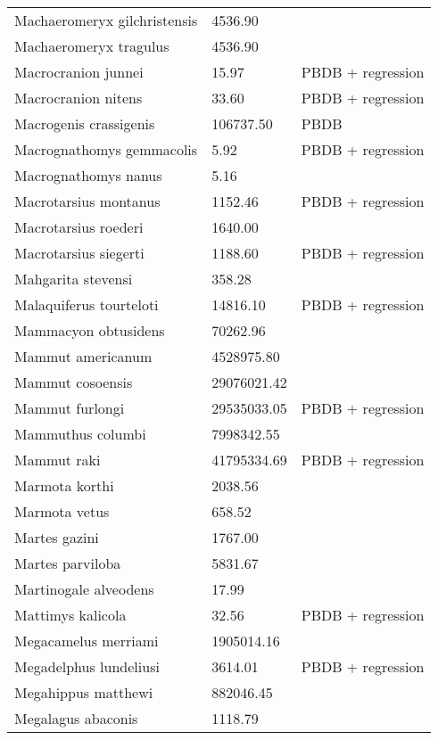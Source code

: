 \documentclass{article}
\begin{document}
\begin{center}
\begin{longtable}{p{} p{} p{} }
  Machaeromeryx gilchristensis & 4536.90 & \cite{Tomiya2013} \\ 
  Machaeromeryx tragulus & 4536.90 & \cite{Tomiya2013} \\ 
  Macrocranion junnei & 15.97 & PBDB + regression \\ 
  Macrocranion nitens & 33.60 & PBDB + regression \\ 
  Macrogenis crassigenis & 106737.50 & PBDB \\ 
  Macrognathomys gemmacolis & 5.92 & PBDB + regression \\ 
  Macrognathomys nanus & 5.16 & \cite{Tomiya2013} \\ 
  Macrotarsius montanus & 1152.46 & PBDB + regression \\ 
  Macrotarsius roederi & 1640.00 & \cite{Soligo2006} \\ 
  Macrotarsius siegerti & 1188.60 & PBDB + regression \\ 
  Mahgarita stevensi & 358.28 & \cite{Wortman1893} \\ 
  Malaquiferus tourteloti & 14816.10 & PBDB + regression \\ 
  Mammacyon obtusidens & 70262.96 & \cite{Tomiya2013} \\ 
  Mammut americanum & 4528975.80 & \cite{Smith2004} \\ 
  Mammut cosoensis & 29076021.42 & \cite{Secord2008a} \\ 
  Mammut furlongi & 29535033.05 & PBDB + regression \\ 
  Mammuthus columbi & 7998342.55 & \cite{Smith2004} \\ 
  Mammut raki & 41795334.69 & PBDB + regression \\ 
  Marmota korthi & 2038.56 & \cite{Tomiya2013} \\ 
  Marmota vetus & 658.52 & \cite{Tomiya2013} \\ 
  Martes gazini & 1767.00 & \cite{McKenna2011} \\ 
  Martes parviloba & 5831.67 & \cite{Macdonald1951} \\ 
  Martinogale alveodens & 17.99 & \cite{Tomiya2013} \\ 
  Mattimys kalicola & 32.56 & PBDB + regression \\ 
  Megacamelus merriami & 1905014.16 & \cite{Tomiya2013} \\ 
  Megadelphus lundeliusi & 3614.01 & PBDB + regression \\ 
  Megahippus matthewi & 882046.45 & \cite{Tomiya2013} \\ 
  Megalagus abaconis & 1118.79 & \cite{Tomiya2013} \\ 

\end{longtable}
\end{center}
\end{document}
